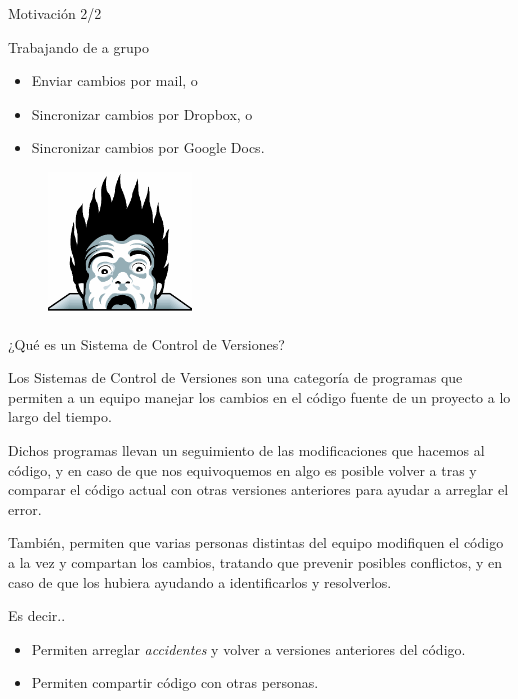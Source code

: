 \begin{frame}{Motivación 2/2}

    \begin{block}{Trabajando de a grupo}
        \begin{itemize}
            \item Enviar cambios por mail, o
            \pause
            \item Sincronizar cambios por Dropbox, o
            \pause
            \item Sincronizar cambios por Google Docs.
        \end{itemize}
    \end{block}

    \pause
    \begin{figure}[h]
        \begin{center}
            \includegraphics[height=1.5in]{images/horror.png}
        \end{center}
    \end{figure}

\end{frame}

\begin{frame}{¿Qué es un Sistema de Control de Versiones?}

	\begin{block}{}
		Los Sistemas de Control de Versiones son una categoría de programas que permiten a un equipo manejar los cambios en el código fuente de un proyecto a lo largo del tiempo.

		Dichos programas llevan un seguimiento de las modificaciones que hacemos al código, y en caso de que nos equivoquemos en algo es posible volver a tras y comparar el código actual con otras versiones anteriores para ayudar a arreglar el error.

		También, permiten que varias personas distintas del equipo modifiquen el código a la vez y compartan los cambios, tratando que prevenir posibles conflictos, y en caso de que los hubiera ayudando a identificarlos y resolverlos.

	\end{block}

    \pause
    \begin{resumen}{Es decir..}
        \begin{itemize}
            \item Permiten arreglar \textit{accidentes} y volver a versiones anteriores del código.
            \item Permiten compartir código con otras personas.
        \end{itemize}
	\end{resumen}

\end{frame}

